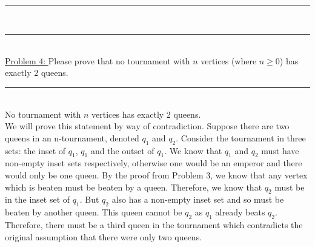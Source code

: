 \documentclass{article}
\newcommand{\problemsep}{\leavevmode\\[0.05in] \rule[\baselineskip/4]{\textwidth}{1pt} \\[0.005in] \rule[\baselineskip]{\textwidth}{1pt}\vspace{-\baselineskip}\leavevmode\\[0.05in]}
\newcommand{\statementsep}{\leavevmode\\[0.005in] \rule[\baselineskip/4]{\textwidth}{0.4pt}\leavevmode\\[0.005in]}
\begin{document}
\problemsep
\noindent\underline{Problem 4: } Please prove that no tournament with $n$ vertices  (where $n \geq 0$) has 
exactly $2$ queens.
\statementsep
{} No tournament with $n$ vertices has exactly 2 queens. \\[0.05in]
 We will prove this statement by way of contradiction. Suppose there are two queens in an n-tournament, denoted $q_1$ and $q_2$. Consider the tournament in three sets: the inset of $q_1$, $q_1$ and the outset of $q_1$. We know that $q_1$ and $q_2$ must have non-empty inset sets respectively, otherwise one would be an emperor and there would only be one queen. By the proof from Problem 3, we know that any vertex which is beaten must be beaten by a queen. Therefore, we know that $q_2$ must be in the inset set of $q_1$.  But $q_2$ also has a non-empty inset set and so must be beaten by another queen.  This queen cannot be $q_2$ as $q_1$ already beats $q_2$. Therefore, there must be a third queen in the tournament which contradicts the original assumption that there were only two queens.
\end{document}
